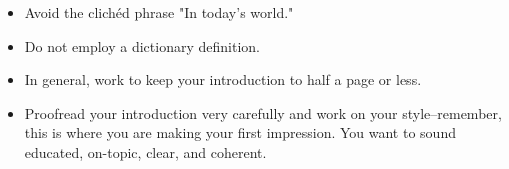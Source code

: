 \begin{itemize}
\item Avoid the clich\'ed phrase "In today's world."
        	
\item Do not employ a dictionary definition.
       	
\item In general, work to keep your introduction to half a page or less.    	  
 
\item Proofread your introduction very carefully and work on your style--remember, 
this is where you are making your first impression. You want to sound educated, 
on-topic, clear, and coherent.
 \end{itemize}
 
